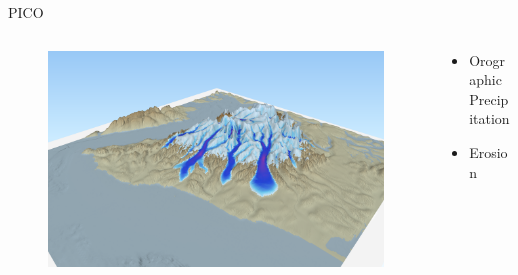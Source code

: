 \documentclass[hide notes,intlimits]{beamer}
\begin{document}
\begin{frame}{PICO}
    \begin{columns}[c]
      \begin{column}{.45\linewidth}
        \begin{figure}
          \includegraphics[width=\textwidth]{olympics-3d}
        \end{figure}
      \end{column}
      \begin{column}{.55\linewidth}
        \begin{itemize}
        \item Orographic Precipitation
        \item Erosion
        \end{itemize}
      \end{column}
    \end{columns}  
\end{frame}
\end{document}
